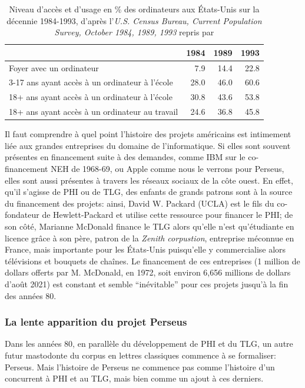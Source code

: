 \begin{table}[ht]
\centering
\begin{tabular}{l|rrr}
                                               & 1984 & 1989 & 1993 \\ \hline  \hline
Foyer avec un ordinateur                       & 7.9  & 14.4 & 22.8 \\ \hline
3-17 ans ayant accès à un ordinateur à l'école & 28.0 & 46.0 & 60.6 \\
18+ ans ayant accès à un ordinateur à l'école  & 30.8 & 43.6 & 53.8 \\
18+ ans ayant accès à un ordinateur au travail & 24.6 & 36.8 & 45.8 \\ \hline
\end{tabular}
\caption{Niveau d'accès et d'usage en \% des ordinateurs aux États-Unis sur la décennie 1984-1993, d'après l'\textit{U.S. Census Bureau, Current Population Survey, October 1984, 1989, 1993} repris par \cite{kominski1999access}}
\label{tab:computer-ownership}
\end{table}

Il faut comprendre à quel point l'histoire des projets américains est intimement liée aux grandes entreprises du domaine de l'informatique. Si elles sont souvent présentes en financement suite à des demandes, comme IBM sur le co-financement NEH de 1968-69, ou Apple comme nous le verrons pour Perseus, elles sont aussi présentes à travers les réseaux sociaux de la côte ouest. En effet, qu'il s'agisse de PHI ou de TLG, des enfants de grands patrons sont à la source du financement des projets: ainsi, David W. Packard (UCLA) est le fils du co-fondateur de Hewlett-Packard et utilise cette ressource pour financer le PHI; de son côté, Marianne McDonald finance le TLG alors qu'elle n'est qu'étudiante en licence grâce à son père, patron de la \textit{Zenith corpustion}, entreprise méconnue en France, mais importante pour les États-Unis puisqu'elle y commercialise alors télévisions et bouquets de chaînes. Le financement de ces entreprises (1 million de dollars offerts par M. McDonald, en 1972, soit environ 6,656 millions de dollars d'août 2021) est constant et semble \enquote{inévitable} pour ces projets jusqu'à la fin des années 80.

\subsubsection{La lente apparition du projet Perseus}

Dans les années 80, en parallèle du développement de PHI et du TLG, un autre futur mastodonte du corpus en lettres classiques commence à se formaliser: Perseus. Mais l'histoire de Perseus ne commence pas comme l'histoire d'un concurrent à PHI et au TLG, mais bien comme un ajout à ces derniers. 

